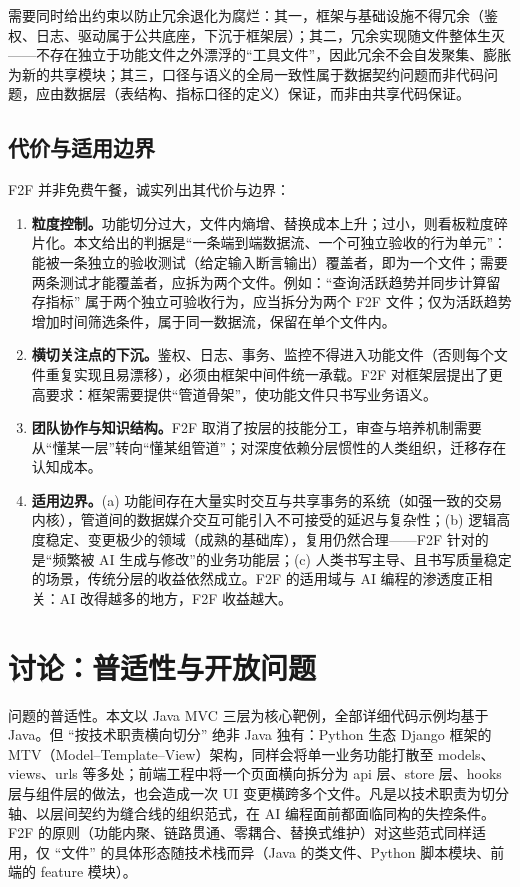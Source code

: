 \documentclass[11pt,a4paper]{ctexart}
\begin{document}
需要同时给出约束以防止冗余退化为腐烂：其一，框架与基础设施不得冗余（鉴权、日志、驱动属于公共底座，下沉于框架层）；其二，冗余实现随文件整体生灭——不存在独立于功能文件之外漂浮的“工具文件”，因此冗余不会自发聚集、膨胀为新的共享模块；其三，口径与语义的全局一致性属于数据契约问题而非代码问题，应由数据层（表结构、指标口径的定义）保证，而非由共享代码保证。

\subsection{代价与适用边界}
F2F 并非免费午餐，诚实列出其代价与边界：

\begin{enumerate}
\item \textbf{粒度控制。}功能切分过大，文件内熵增、替换成本上升；过小，则看板粒度碎片化。本文给出的判据是“一条端到端数据流、一个可独立验收的行为单元”：能被一条独立的验收测试（给定输入断言输出）覆盖者，即为一个文件；需要两条测试才能覆盖者，应拆为两个文件。例如：“查询活跃趋势并同步计算留存指标” 属于两个独立可验收行为，应当拆分为两个 F2F 文件；仅为活跃趋势增加时间筛选条件，属于同一数据流，保留在单个文件内。
\item \textbf{横切关注点的下沉。}鉴权、日志、事务、监控不得进入功能文件（否则每个文件重复实现且易漂移），必须由框架中间件统一承载。F2F 对框架层提出了更高要求：框架需要提供“管道骨架”，使功能文件只书写业务语义。
\item \textbf{团队协作与知识结构。}F2F 取消了按层的技能分工，审查与培养机制需要从“懂某一层”转向“懂某组管道”；对深度依赖分层惯性的人类组织，迁移存在认知成本。
\item \textbf{适用边界。}(a) 功能间存在大量实时交互与共享事务的系统（如强一致的交易内核），管道间的数据媒介交互可能引入不可接受的延迟与复杂性；(b) 逻辑高度稳定、变更极少的领域（成熟的基础库），复用仍然合理——F2F 针对的是“频繁被 AI 生成与修改”的业务功能层；(c) 人类书写主导、且书写质量稳定的场景，传统分层的收益依然成立。F2F 的适用域与 AI 编程的渗透度正相关：AI 改得越多的地方，F2F 收益越大。
\end{enumerate}

\section{讨论：普适性与开放问题}
问题的普适性。本文以 Java MVC 三层为核心靶例，全部详细代码示例均基于 Java。但 “按技术职责横向切分” 绝非 Java 独有：Python 生态 Django 框架的 MTV（Model–Template–View）架构，同样会将单一业务功能打散至 models、views、urls 等多处；前端工程中将一个页面横向拆分为 api 层、store 层、hooks 层与组件层的做法，也会造成一次 UI 变更横跨多个文件。凡是以技术职责为切分轴、以层间契约为缝合线的组织范式，在 AI 编程面前都面临同构的失控条件。F2F 的原则（功能内聚、链路贯通、零耦合、替换式维护）对这些范式同样适用，仅 “文件” 的具体形态随技术栈而异（Java 的类文件、Python 脚本模块、前端的 feature 模块）。
\end{document}
